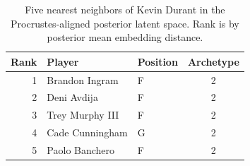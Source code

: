\begin{table}[htbp]
  \centering\small
  \begin{tabular}{rllc}
    \toprule
    Rank & Player & Position & Archetype \\
    \midrule
    1 & Brandon Ingram & F & 2 \\
    2 & Deni Avdija & F & 2 \\
    3 & Trey Murphy III & F & 2 \\
    4 & Cade Cunningham & G & 2 \\
    5 & Paolo Banchero & F & 2 \\
    \bottomrule
  \end{tabular}
  \caption{Five nearest neighbors of Kevin Durant in the Procrustes-aligned posterior latent space. Rank is by posterior mean embedding distance.}
  \label{tab:Kevin_Durant_neighbors}
\end{table}

